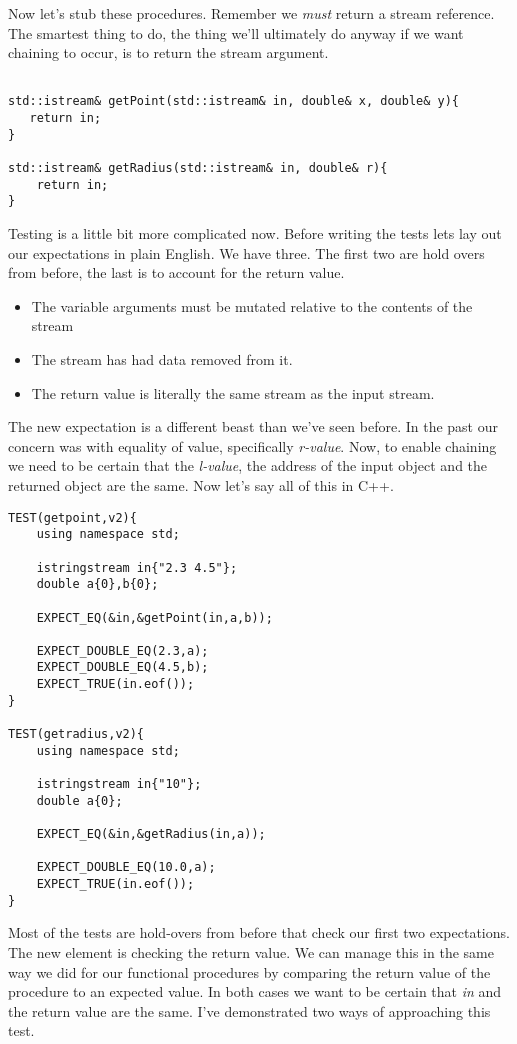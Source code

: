 \documentclass[]{tufte-handout}
\begin{document}
Now let's stub these procedures. Remember we \textit{must} return a stream reference. The smartest thing to do, the thing we'll ultimately do anyway if we want chaining to occur, is to return the stream argument. 
\begin{verbatim}

std::istream& getPoint(std::istream& in, double& x, double& y){ 
   return in;
}

std::istream& getRadius(std::istream& in, double& r){
	return in;
}

\end{verbatim}

Testing is a little bit more complicated now. Before writing the tests lets lay out our expectations in plain English. We have three. The first two are hold overs from before, the last is to account for the return value.
\begin{itemize}
\item The variable arguments must be mutated relative to the contents of the stream
\item The stream has had data removed from it.
\item The return value is literally the same stream as the input stream.
\end{itemize}
The new expectation is a different beast than we've seen before. In the past our concern was with equality of value, specifically \textit{r-value}. Now, to enable chaining we need to be certain that the \textit{l-value}, the address of the input object and the returned object are the same. Now let's say all of this in C++.
\begin{verbatim}
TEST(getpoint,v2){
    using namespace std;

    istringstream in{"2.3 4.5"};
    double a{0},b{0};

    EXPECT_EQ(&in,&getPoint(in,a,b));

    EXPECT_DOUBLE_EQ(2.3,a);
    EXPECT_DOUBLE_EQ(4.5,b);
    EXPECT_TRUE(in.eof());
}

TEST(getradius,v2){
    using namespace std;

    istringstream in{"10"};
    double a{0};

    EXPECT_EQ(&in,&getRadius(in,a));

    EXPECT_DOUBLE_EQ(10.0,a);
    EXPECT_TRUE(in.eof());
}
\end{verbatim}
Most of the tests are hold-overs from before that check our first two expectations. The new element is checking the return value.  We can manage this in the same way we did for our functional procedures by comparing the return value of the procedure to an expected value. In both cases we want to be certain
that \textit{in} and the return value are the same. I've demonstrated two ways of approaching this test.  
\end{document}
